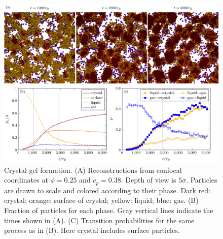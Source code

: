 \documentclass[12pt]{article}
\begin{document}
\begin{figure}
 \centering
 \includegraphics[width=16cm]{crystal}
 \caption{
Crystal gel formation.  
(A) Reconstructions from confocal coordinates at $\phi=0.25$ and $c_p=0.38$. Depth of view is $5\sigma$. Particles are drawn to scale and colored according to their phase. Dark red: crystal; orange: surface of crystal; yellow: liquid; blue: gas. 
(B) Fraction of particles for each phase. Gray vertical lines indicate the times shown in (A). 
(C) Transition probabilities for the same process as in (B). Here crystal includes surface particles.}
\label{fig:transitions}
\end{figure}
\end{document}
